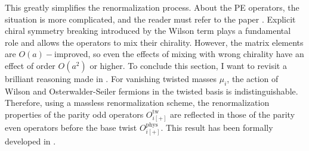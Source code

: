 \documentclass[english, LaM, oneside, noexaminfo]{sapthesis}
\newcommand{\oaid}{$O(a)-$improved}
\begin{document}
This greatly simplifies the renormalization process.
About the PE operators, the situation is more complicated, and the reader must refer to the paper \cite{DoniniMartinelliOperators}.
Explicit chiral symmetry breaking introduced by the Wilson term plays a fundamental role and allows the operators to mix their chirality.
However, the matrix elements are \oaid, so even the effects of mixing with wrong chirality have an effect of order $O(a^2)$ or higher.
\newline
To conclude this section, I want to revisit a brilliant reasoning made in \cite{KMBSM}.
For vanishing twisted masses $\mu_i$, the action of Wilson and Osterwalder-Seiler fermions in the twisted basis is indistinguishable.
Therefore, using a massless renormalization scheme, the renormalization properties of the parity odd operators $O_{i[+]}^\text{tw}$ are reflected in those of the parity even operators before the base twist $O_{i[+]}^\text{phys}$.
This result has been formally developed in \cite{FR2}.
\end{document}
